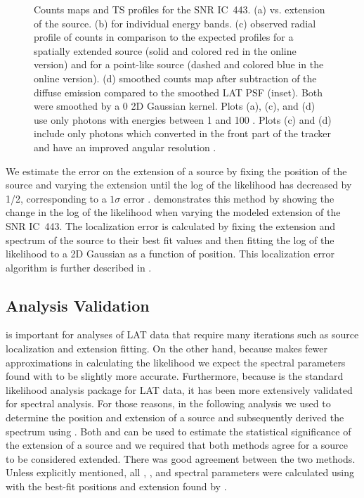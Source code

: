 \begin{figure}
    \fi
    \caption{
    Counts maps and TS profiles for the SNR IC~443. (a) \ts
    vs. extension of the source. (b) \tsext for individual energy
    bands. (c) observed radial profile of counts in comparison to the
    expected profiles for a spatially extended source (solid and colored
    red in the online version) and for a point-like source (dashed and colored
    blue in the online version).  (d) smoothed counts map after subtraction
    of the diffuse emission compared to the smoothed
    LAT PSF (inset). Both were smoothed by a 0 2D Gaussian kernel.
    Plots (a),
    (c), and (d) use only 
    photons with energies between
    1 \gev and 100 \gev.  Plots (c) and (d) include
    only photons which converted in the front part of the tracker and
    have an improved angular resolution \citep{atwood_2009a_large-telescope}.
    }
\end{figure}


We estimate the error on the extension of a source by fixing
the position of the source and varying the extension until the
log of the likelihood has decreased by 1/2, corresponding to a $1\sigma$ error
\citep{eadie_1971a_statistical-methods}.  
demonstrates this method by showing the change in the log of the
likelihood when 
varying the modeled extension of the SNR IC~443.  The localization
error is calculated by fixing the extension and spectrum of the source
to their best fit values and then
fitting the log of the likelihood to
a 2D Gaussian as a function
of position. This localization error algorithm is further described in
\cite{nolan_2012_fermi-large}.

\subsection{\gtlike Analysis Validation}

\pointlike is important for analyses of LAT data that require many iterations
such as source localization and extension fitting.  On the other hand,
because \gtlike makes fewer approximations in calculating the likelihood
we expect the spectral parameters found with \gtlike to be slightly more
accurate.  Furthermore, because \gtlike is the 
standard likelihood analysis package for LAT data, 
it has been more extensively validated for spectral analysis.
For those reasons, in the following analysis we used \pointlike to
determine the position and extension of a source and subsequently derived
the spectrum using \gtlike. Both \gtlike and \pointlike can be used to
estimate the statistical significance of the extension of a source and we
required that both methods agree for a source to be considered extended.
There was good agreement between the two methods.  Unless explicitly
mentioned, all \ts, \tsext, and spectral parameters were calculated using
\gtlike with the best-fit positions and extension found by \pointlike.


